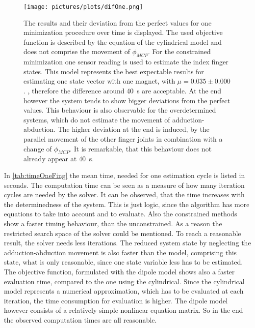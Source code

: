 \begin{figure}[!htb]
\centering
\texttt{[image: pictures/plots/difOne.png]}
\caption[Estimated states vs. perfect states for using one magnet, one sensor.]
{The results and their deviation from the perfect values for one minimization procedure over time is displayed. The used objective function is described by the equation of the cylindrical model and does not comprise the movement of $ \phi_{MCP} $. For the constrained minimization one sensor reading is used to estimate the index finger states. This model represents the best expectable results for estimating one state vector with one magnet, with $ \mu = 0.035 \pm 0.000 $. , therefore the difference around \SI{40}{\second} are acceptable. At the end however the system tends to show bigger deviations from the perfect values. This behaviour is also observable for the overdetermined systems, which do not estimate the movement of adduction-abduction. The higher deviation at the end is induced, by the parallel movement of the other finger joints in combination with a change of $ \phi_{MCP} $. It is remarkable, that this behaviour does not already appear at \SI{40}{\second}.  }
\label{fig:11cylNa1}
\end{figure}
In \ref{tab:timeOneFing} the mean time, needed for one estimation cycle is listed in seconds. The computation time can be seen as a measure of how many iteration cycles are needed by the solver. It can be observed, that the time increases with the determinedness of the system. This is just logic, since the algorithm has more equations to take into account and to evaluate. Also the constrained methods show a faster timing behaviour, than the unconstrained. As a reason the restricted search space of the solver could be mentioned. To reach a reasonable result, the solver needs less iterations. The reduced system state by neglecting the adduction-abduction movement is also faster than the model, comprising this state, what is only reasonable, since one state variable less has to be estimated. The objective function, formulated with the dipole model shows also a faster evaluation time, compared to the one using the cylindrical. Since the cylindrical model represents a numerical approximation, which has to be evaluated at each iteration, the time consumption for evaluation is higher. The dipole model however consists of a relatively simple nonlinear equation matrix. So in the end the observed computation times are all reasonable.\\
